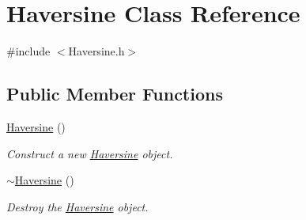 \hypertarget{class_haversine}{}\section{Haversine Class Reference}
\label{class_haversine}


{\ttfamily \#include $<$Haversine.\+h$>$}

\subsection*{Public Member Functions}
\begin{DoxyCompactItemize}
\item 
\hyperlink{class_haversine_a844317944919ea6745317cd8f74b18c6}{Haversine} ()
\begin{DoxyCompactList}\small\item\em Construct a new \hyperlink{class_haversine}{Haversine} object. \end{DoxyCompactList}\item 
\hyperlink{class_haversine_a76d03fdeba1099dedca1f0c53d20c335}{$\sim$\+Haversine} ()
\begin{DoxyCompactList}\small\item\em Destroy the \hyperlink{class_haversine}{Haversine} object. \end{DoxyCompactList}\end{DoxyCompactItemize}
